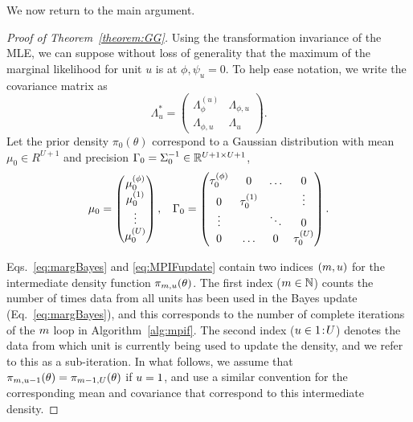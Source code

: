 \documentclass[12pt]{article}\usepackage[]{graphicx}\usepackage[]{xcolor}
\begin{document}
\begin{appendices}
We now return to the main argument.

\begin{proof}[Proof of Theorem~\ref{theorem:GG}]
Using the transformation invariance of the MLE, we can suppose without loss of generality that the maximum of the marginal likelihood for unit $u$ is at $\phi, \psi_u = 0$.
To help ease notation, we write the covariance matrix as
$$
\Lambda^*_u = \begin{pmatrix}
    \Lambda^{(u)}_{\phi} & \Lambda_{\phi, u} \\
    \Lambda_{\phi, u} & \Lambda_{u}
\end{pmatrix}.
$$
Let the prior density $\pi_0(\theta)$ correspond to a Gaussian distribution with mean $\mu_0 \in R^{U+1}$ and precision $\Gamma_0 = \Sigma^{-1}_0 \in \mathbb{R}^{U+1\times U+1}$,
\begin{align*}
    \mu_0 = \begin{pmatrix}
        \mu_0^{(\phi)} \\
        \mu_0^{(1)} \\
        \vdots \\
        \mu_0^{(U)}
    \end{pmatrix}, \, \, \hspace{2mm} \Gamma_0 = \begin{pmatrix}
        \tau^{(\phi)}_0 & 0 & \ldots & 0 \\
        0 & \tau^{(1)}_0 & & \vdots \\
        \vdots & & \ddots & 0\\
        0 & \ldots & 0 & \tau^{(U)}_0
    \end{pmatrix}.
\end{align*}

Eqs.~\ref{eq:margBayes} and \ref{eq:MPIFupdate} contain two indices $(m, u)$ for the intermediate density function $\pi_{m, u}(\theta)$.
The first index ($m \in \mathbb{N}$) counts the number of times data from all units has been used in the Bayes update (Eq.~\ref{eq:margBayes}), and this corresponds to the number of complete iterations of the $m$ loop in Algorithm~\ref{alg:mpif}.
The second index ($u \in {1}\!:\!{U}$) denotes the data from which unit is currently being used to update the density, and we refer to this as a sub-iteration.
In what follows, we assume that $\pi_{m, u - 1}(\theta) = \pi_{m - 1, U}(\theta)$ if $u = 1$, and use a similar convention for the corresponding mean and covariance that correspond to this intermediate density.


\end{proof}
\end{appendices}
\end{document}
